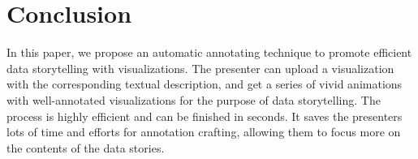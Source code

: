 \documentclass{vgtc}                          %
\begin{document}
\section{Conclusion}

In this paper, we propose an automatic annotating technique to promote efficient data storytelling with visualizations. The presenter can upload a visualization with the corresponding textual description, and get a series of vivid animations with well-annotated visualizations for the purpose of data storytelling. The process is highly efficient and can be finished in seconds. It saves the presenters lots of time and efforts for annotation crafting, allowing them to focus more on the contents of the data stories.




%
%
%
%


\end{document}
